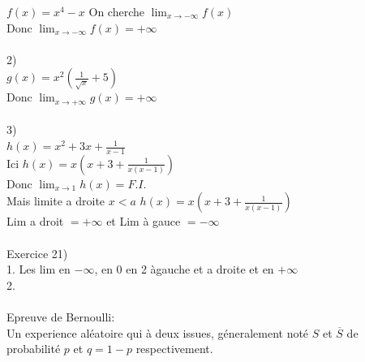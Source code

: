 \documentclass[french]{article}
\begin{document}
$f(x)=x^4-x$ On cherche $\lim_{x\to-\infty}f(x)$ \\
Donc $\lim_{x\to-\infty}f(x)=+\infty$ \\
\\
2) \\
$g(x) = x^2\left(\frac{1}{\sqrt{x}}+5\right)$ \\
Donc $\lim_{x\to+\infty}g(x)=+\infty$ \\
\\
3) \\
$h(x) = x^2+3x+\frac{1}{x-1}$ \\
Ici $h(x)=x(x+3+\frac{1}{x(x-1)})$ \\
Donc $\lim_{x\to1}h(x)=F.I.$ \\
Mais limite a droite $x<a$ $h(x)=x(x+3+\frac{1}{x(x-1)})$ \\
Lim a droit $=+\infty$ et Lim à gauce $=-\infty$ \\
\\
Exercice 21) \\
1. Les lim en $-\infty$, en 0 en 2  àgauche et a droite et en $+\infty$ \\
2.  \\
\\
Epreuve de Bernoulli: \\
Un experience aléatoire qui à deux issues, géneralement noté $S$ et $\overline{S}$ de probabilité $p$ et $q=1-p$ respectivement.
\end{document}
